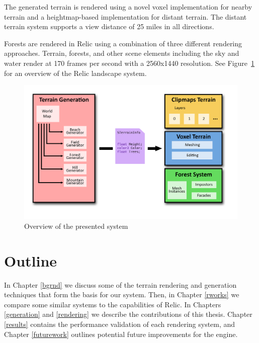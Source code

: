 The generated terrain is rendered using a novel voxel implementation for nearby terrain and a heightmap-based implementation for distant terrain.
The distant terrain system supports a view distance of 25 miles in all directions.

Forests are rendered in Relic using a combination of three different rendering approaches.
Terrain, forests, and other scene elements including the sky and water render at 170 frames per second with a 2560x1440 resolution.
See Figure~\ref{fig:system1} for an overview of the Relic landscape system.

\begin{figure}
  \centering
    \includegraphics[width=1.0\textwidth]{figures/SystemDiagram.png}
  \caption{Overview of the presented system}
  \label{fig:system1}
\end{figure}


\section{Outline}

In Chapter \ref{bgrnd} we discuss some of the terrain rendering and generation techniques that form the basis for our system.
Then, in Chapter \ref{rworks} we compare some similar systems to the capabilities of Relic.
In Chapters \ref{generation} and \ref{rendering} we describe the contributions of this thesis.
Chapter \ref{results} contains the performance validation of each rendering system, and Chapter \ref{futurework} outlines potential future improvements for the engine.
